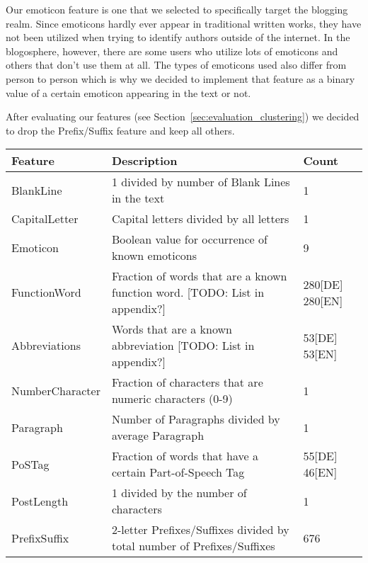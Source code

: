 Our emoticon feature is one that we selected to specifically target the blogging realm.
Since emoticons hardly ever appear in traditional written works, they have not been utilized when trying to identify authors outside of the internet.
In the blogosphere, however, there are some users who utilize lots of emoticons and others that don't use them at all.
The types of emoticons used also differ from person to person which is why we decided to implement that feature as a binary value of a certain emoticon appearing in the text or not.


After evaluating our features (see Section~\ref{sec:evaluation_clustering}) we decided to drop the Prefix/Suffix feature and keep all others.

\begin{table}[h]
    \begin{center}
    \begin{tabular}{p{2.6cm}|p{8.2cm}|p{1.2cm}}
    Feature					& Description																	& Count				\\ \hline
    BlankLine				& 1 divided by number of Blank Lines in the text								& 1					\\ \hline
    CapitalLetter			& Capital letters divided by all letters										& 1					\\ \hline
    Emoticon				& Boolean value for occurrence of known emoticons								& 9					\\ \hline
    FunctionWord			& Fraction of words that are a known function word. [TODO: List in appendix?]	& 280[DE] 280[EN]	\\ \hline
    Abbreviations			& Words that are a known abbreviation [TODO: List in appendix?]					& 53[DE] 53[EN]		\\ \hline
    NumberCharacter			& Fraction of characters that are numeric characters (0-9)						& 1					\\ \hline
    Paragraph				& Number of Paragraphs divided by average Paragraph								& 1					\\ \hline
    PoSTag					& Fraction of words that have a certain Part-of-Speech Tag                      & 55[DE] 46[EN]  	\\ \hline
    PostLength				& 1 divided by the number of characters											& 1					\\ \hline
    PrefixSuffix			& 2-letter Prefixes/Suffixes divided by total number of Prefixes/Suffixes		& 676 			 	\\ \hline

\end{tabular}
\end{center}
\end{table}

